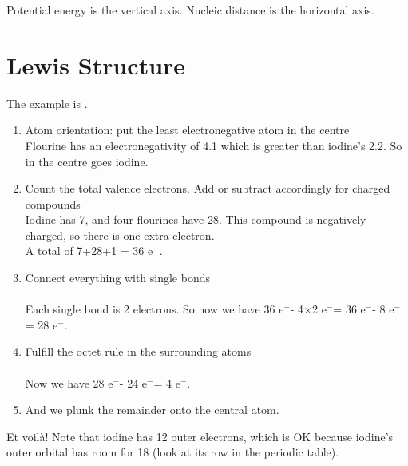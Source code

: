 \documentclass[a4paper, 8pt]{memoir}
\newcommand*{\el}{e$^-$}
\begin{document}
Potential energy is the vertical axis. Nucleic distance is the horizontal axis.

\chapter{Lewis Structure}
The example is \ce{[FI_{4}]^{-}}.
\begin{enumerate}
\item Atom orientation: put the least electronegative atom in the centre \\
Flourine has an electronegativity of 4.1 which is greater than iodine's 2.2. So in the centre goes iodine.
\item Count the total valence electrons. Add or subtract accordingly for charged compounds  \\
Iodine has 7, and four flourines have 28. This compound is negatively-charged, so there is one extra electron.  \\
A total of 7+28+1 = 36 \el.
\item Connect everything with single bonds \\
 \\
Each single bond is 2 electrons. So now we have 36 \el - 4$\times$2 \el = 36 \el - 8 \el = 28 \el.
\item Fulfill the octet rule in the surrounding atoms \\
 \\
Now we have 28 \el - 24 \el = 4 \el.
\item And we plunk the remainder onto the central atom. \\
\end{enumerate}

Et voilà! Note that iodine has 12 outer electrons, which is OK because iodine's outer orbital has room for 18 (look at its row in the periodic table).
\end{document}
